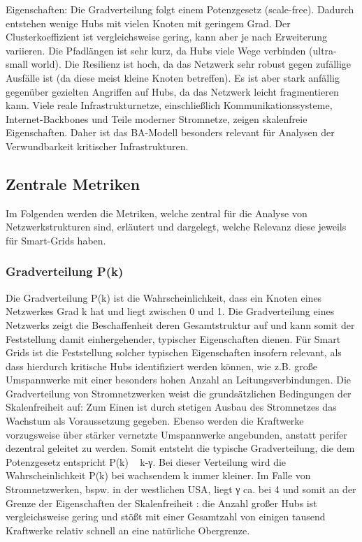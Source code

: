 Eigenschaften:
	Die Gradverteilung folgt einem Potenzgesetz (scale-free). Dadurch entstehen wenige Hubs mit vielen Knoten mit geringem Grad.
	Der Clusterkoeffizient ist vergleichsweise gering, kann aber je nach Erweiterung variieren.
	Die Pfadlängen ist sehr kurz, da Hubs viele Wege verbinden (ultra-small world).
	Die Resilienz ist hoch, da das Netzwerk sehr robust gegen zufällige Ausfälle ist (da diese meist kleine Knoten betreffen). Es ist aber stark anfällig gegenüber gezielten Angriffen auf Hubs, da das Netzwerk leicht fragmentieren kann.
Viele reale Infrastrukturnetze, einschließlich Kommunikationssysteme, Internet-Backbones und Teile moderner Stromnetze, zeigen skalenfreie Eigenschaften. Daher ist das BA-Modell besonders relevant für Analysen der Verwundbarkeit kritischer Infrastrukturen.

\subsection{Zentrale Metriken} 
Im Folgenden werden die Metriken, welche zentral für die Analyse von Netzwerkstrukturen sind, erläutert und dargelegt, welche Relevanz diese jeweils für Smart-Grids haben. 
\subsubsection{Gradverteilung P(k)}
Die Gradverteilung P(k) ist die Wahrscheinlichkeit, dass ein Knoten eines Netzwerkes Grad k hat und liegt zwischen 0 und 1. Die Gradverteilung eines Netzwerks zeigt die Beschaffenheit deren Gesamtstruktur auf und kann somit der Feststellung damit einhergehender, typischer Eigenschaften dienen. Für Smart Grids ist die Feststellung solcher typischen Eigenschaften insofern relevant, als dass hierdurch kritische Hubs identifiziert werden können, wie z.B. große Umspannwerke mit einer besonders hohen Anzahl an Leitungsverbindungen. Die Gradverteilung von Stromnetzwerken weist die grundsätzlichen Bedingungen der Skalenfreiheit auf: Zum Einen ist durch stetigen Ausbau des Stromnetzes das Wachstum als Voraussetzung gegeben. Ebenso werden die Kraftwerke vorzugsweise über stärker vernetzte Umspannwerke angebunden, anstatt perifer dezentral geleitet zu werden. Somit entsteht die typische Gradverteilung, die dem Potenzgesetz entspricht P(k) ~ k-γ. Bei dieser Verteilung wird die Wahrscheinlichkeit P(k) bei wachsendem k immer kleiner. Im Falle von Stromnetzwerken, bspw. in der westlichen USA, liegt γ ca. bei 4 und somit an der Grenze der Eigenschaften der Skalenfreiheit : die Anzahl großer Hubs ist vergleichsweise gering und stößt mit einer Gesamtzahl von einigen tausend Kraftwerke relativ schnell an eine natürliche Obergrenze. 
